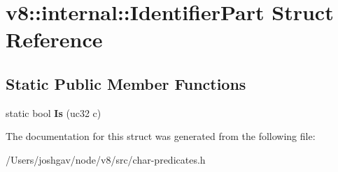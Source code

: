 \hypertarget{structv8_1_1internal_1_1_identifier_part}{}\section{v8\+:\+:internal\+:\+:Identifier\+Part Struct Reference}
\label{structv8_1_1internal_1_1_identifier_part}
\subsection*{Static Public Member Functions}
\begin{DoxyCompactItemize}
\item 
static bool {\bfseries Is} (uc32 c)\hypertarget{structv8_1_1internal_1_1_identifier_part_aad25a6323106be19f2de741c31ba24a7}{}\label{structv8_1_1internal_1_1_identifier_part_aad25a6323106be19f2de741c31ba24a7}

\end{DoxyCompactItemize}


The documentation for this struct was generated from the following file\+:\begin{DoxyCompactItemize}
\item 
/\+Users/joshgav/node/v8/src/char-\/predicates.\+h\end{DoxyCompactItemize}
